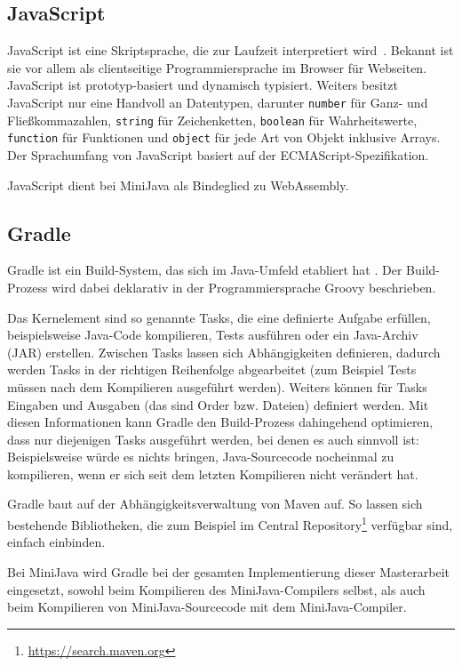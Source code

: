 \subsection{JavaScript}
JavaScript ist eine Skriptsprache, die zur Laufzeit interpretiert wird \cite{MDNJavaScript}. Bekannt ist sie vor allem als clientseitige Programmiersprache im Browser für Webseiten. JavaScript ist prototyp-basiert und dynamisch typisiert. Weiters besitzt JavaScript nur eine Handvoll an Datentypen, darunter \lstinline{number} für Ganz- und Fließkommazahlen, \lstinline{string} für Zeichenketten, \lstinline{boolean} für Wahrheitswerte, \lstinline{function} für Funktionen und \lstinline{object} für jede Art von Objekt inklusive Arrays. Der Sprachumfang von JavaScript basiert auf der ECMAScript-Spezifikation.

JavaScript dient bei MiniJava als Bindeglied zu WebAssembly.

\subsection{Gradle}
Gradle ist ein Build-System, das sich im Java-Umfeld etabliert hat \cite{Gradle}. Der Build-Prozess wird dabei deklarativ in der Programmiersprache Groovy beschrieben.

Das Kernelement sind so genannte Tasks, die eine definierte Aufgabe erfüllen, beispielsweise Java-Code kompilieren, Tests ausführen oder ein Java-Archiv (JAR) erstellen. Zwischen Tasks lassen sich Abhängigkeiten definieren, dadurch werden Tasks in der richtigen Reihenfolge abgearbeitet (zum Beispiel Tests müssen nach dem Kompilieren ausgeführt werden). Weiters können für Tasks Eingaben und Ausgaben (das sind Order bzw. Dateien) definiert werden. Mit diesen Informationen kann Gradle den Build-Prozess dahingehend optimieren, dass nur diejenigen Tasks ausgeführt werden, bei denen es auch sinnvoll ist: Beispielsweise würde es nichts bringen, Java-Sourcecode nocheinmal zu kompilieren, wenn er sich seit dem letzten Kompilieren nicht verändert hat.

Gradle baut auf der Abhängigkeitsverwaltung von Maven auf. So lassen sich bestehende Bibliotheken, die zum Beispiel im Central Repository\footnote{\url{https://search.maven.org}} verfügbar sind, einfach einbinden.

Bei MiniJava wird Gradle bei der gesamten Implementierung dieser Masterarbeit eingesetzt, sowohl beim Kompilieren des MiniJava-Compilers selbst, als auch beim Kompilieren von MiniJava-Sourcecode mit dem MiniJava-Compiler.

